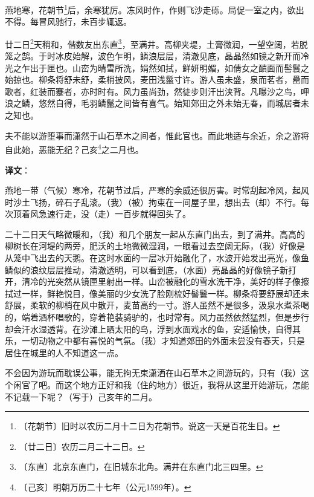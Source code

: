 \documentclass[12pt,UTF-8,openany]{ctexbook}
\begin{document}
\begin{normalsize}
    
    燕地寒，花朝节\footnote{〔花朝节〕旧时以农历二月十二日为花朝节。说这一天是百花生日。}后，余寒犹厉。冻风时作，作则飞沙走砾。局促一室之内，欲出不得。每冒风驰行，未百步辄返。
    
    廿二日\footnote{〔廿二日〕农历二月二十二日。}天稍和，偕数友出东直\footnote{〔东直〕北京东直门，在旧城东北角。满井在东直门北三四里。}，至满井。高柳夹堤，土膏微润，一望空阔，若脱笼之鹄。于时冰皮始解，波色乍明，鳞浪层层，清澈见底，晶晶然如镜之新开而冷光之乍出于匣也。山峦为晴雪所洗，娟然如拭，鲜妍明媚，如倩女之靧面而髻鬟之始掠也。柳条将舒未舒，柔梢披风，麦田浅鬣寸许。游人虽未盛，泉而茗者，罍而歌者，红装而蹇者，亦时时有。风力虽尚劲，然徒步则汗出浃背。凡曝沙之鸟，呷浪之鳞，悠然自得，毛羽鳞鬣之间皆有喜气。始知郊田之外未始无春，而城居者未之知也。
    
    夫不能以游堕事而潇然于山石草木之间者，惟此官也。而此地适与余近，余之游将自此始，恶能无纪？己亥\footnote{〔己亥〕明朝万历二十七年（公元1599年）。}之二月也。
\end{normalsize}


\newpage

\textbf{译文}：

\vspace{1em}

\begin{normalsize}
    
    燕地一带（气候）寒冷，花朝节过后，严寒的余威还很厉害。时常刮起冷风，起风时沙土飞扬，碎石子乱滚。（我）（被）拘束在一间屋子里，想出去（却）不行。每次顶着风急速行走，没（走）一百步就得回头了。
    
    二十二日天气略微暖和，（我）和几个朋友一起从东直门出去，到了满井。高高的柳树长在河堤的两旁，肥沃的土地微微湿润，一眼看过去空阔无际，（我）好像是从笼中飞出去的天鹅。在这时水面的一层冰开始融化了，水波开始发出亮光，像鱼鳞似的浪纹层层推动，清澈透明，可以看到底，（水面）亮晶晶的好像镜子新打开，清冷的光突然从镜匣里射出一样。山峦被融化的雪水洗干净，美好的样子像擦拭过一样，鲜艳悦目，像美丽的少女洗了脸刚梳好髻鬟一样。柳条将要舒展却还未舒展，柔软的柳梢在风中散开，麦苗高约一寸。游人虽然不是很多，汲泉水煮茶喝的，端着酒杯唱歌的，穿着艳装骑驴的，也时常有。风力虽然依然猛烈，但是步行却会汗水湿透背。在沙滩上晒太阳的鸟，浮到水面戏水的鱼，安适愉快，自得其乐，一切动物之中都有喜悦的气氛。（我）才知道郊田的外面未尝没有春天，只是居住在城里的人不知道这一点。
    
    不会因为游玩而耽误公事，能无拘无束潇洒在山石草木之间游玩的，只有（我）这个闲官了吧。而这个地方正好和我（住的地方）很近，我将从这里开始游玩，怎能不记载一下呢？（写于）己亥年的二月。
    
\end{normalsize}
\end{document}

